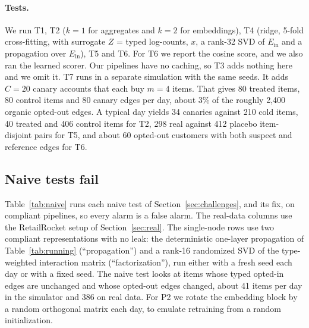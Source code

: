\documentclass[10pt,twocolumn,letterpaper]{article}
\theoremstyle{definition}
\newcommand{\Ein}{E_{\mathrm{in}}}
\begin{document}
\paragraph{Tests.}
We run T1, T2 ($k{=}1$ for aggregates and $k{=}2$ for embeddings), T4 (ridge,
5-fold cross-fitting, with surrogate $Z$ = typed log-counts, $x$, a rank-32 SVD
of $\Ein$ and a propagation over $\Ein$), T5 and T6. For T6 we report the cosine
score, and we also ran the learned scorer. Our pipelines have no caching,
so T3 adds nothing here and we omit it. T7 runs in a separate simulation with
the same seeds. It adds $C=20$ canary accounts that each buy $m=4$ items. That
gives 80 treated items, 80 control items and 80 canary edges per day, about 3\%
of the roughly 2{,}400 organic opted-out edges. A typical day yields
34 canaries against 210 cold items, 40 treated and 406 control items for T2,
298 real against 412 placebo item-disjoint pairs for T5, and about 60
opted-out customers with both suspect and reference edges for T6.

\subsection{Naive tests fail}\label{sec:naive}
Table~\ref{tab:naive} runs each naive test of Section~\ref{sec:challenges}, and
its fix, on compliant pipelines, so every alarm is a false alarm. The real-data
columns use the RetailRocket setup of Section~\ref{sec:real}. The single-node
rows use two compliant representations with no leak: the deterministic
one-layer propagation of Table~\ref{tab:running} (``propagation'') and a
rank-16 randomized SVD of the type-weighted interaction matrix
(``factorization''), run either with a fresh seed each day or with a fixed
seed. The naive test looks at items whose typed opted-in edges are unchanged
and whose opted-out edges changed, about 41 items per day in the simulator and
386 on real data. For P2 we rotate the embedding block by a random orthogonal
matrix each day, to emulate retraining from a random initialization.
\end{document}

